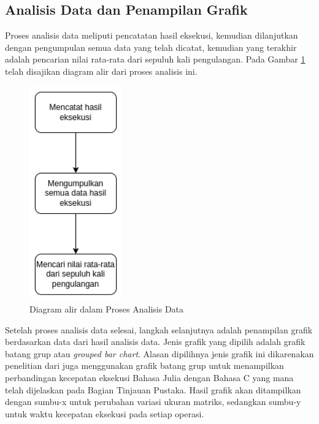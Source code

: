 \subsection{Analisis Data dan Penampilan Grafik}

Proses analisis data meliputi pencatatan hasil eksekusi, kemudian dilanjutkan
dengan pengumpulan semua data yang telah dicatat, kemudian yang terakhir adalah
pencarian nilai rata-rata dari sepuluh kali pengulangan. Pada Gambar
\ref{img:methods_analysist} telah disajikan diagram alir dari proses analisis
ini.

\begin{figure}[h]
	\centering
	\includegraphics[width=4cm, scale=1]{schema/langkah-3.drawio.png}
	\caption{Diagram alir dalam Proses Analisis Data}
	\label{img:methods_analysist}
\end{figure}

Setelah proses analisis data selesai, langkah selanjutnya adalah penampilan
grafik berdasarkan data dari hasil analisis data. Jenis grafik yang dipilih
adalah grafik batang grup atau \emph{grouped bar chart}. Alasan dipilihnya
jenis grafik ini dikarenakan penelitian dari
\cite{hunoldBenchmarkingJuliaCommunication2020} juga menggunakan grafik batang
grup untuk menampilkan perbandingan kecepatan eksekusi Bahasa Julia dengan
Bahasa C yang mana telah dijelaskan pada Bagian Tinjauan Pustaka. Hasil grafik
akan ditampilkan dengan sumbu-x untuk perubahan variasi ukuran matriks,
sedangkan sumbu-y untuk waktu kecepatan eksekusi pada setiap operasi.


